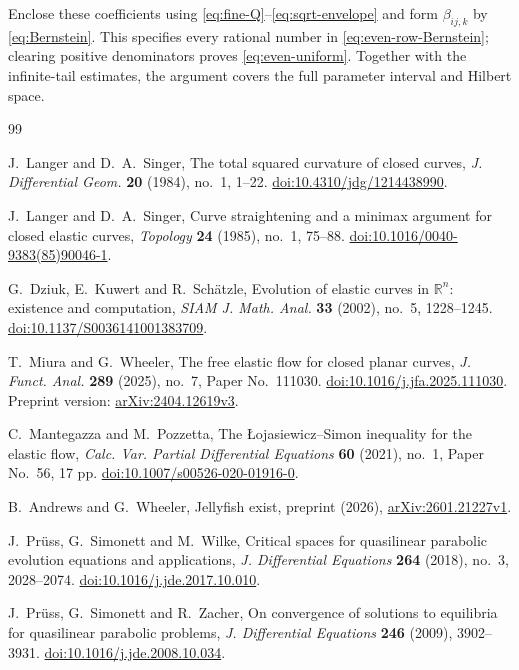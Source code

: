 \documentclass[a4paper,11pt]{article}
\numberwithin{equation}{section}
\theoremstyle{definition}
\theoremstyle{remark}
\newcommand{\R}{\mathbb R}
\begin{document}
Enclose these coefficients using \eqref{eq:fine-Q}--\eqref{eq:sqrt-envelope} and form $\beta_{ij,k}$ by \eqref{eq:Bernstein}. This specifies every rational number in \eqref{eq:even-row-Bernstein}; clearing positive denominators proves \eqref{eq:even-uniform}. Together with the infinite-tail estimates, the argument covers the full parameter interval and Hilbert space.


\begin{thebibliography}{99}
\raggedright
\small
{}
J.~Langer and D.~A.~Singer,
The total squared curvature of closed curves,
\emph{J. Differential Geom.} \textbf{20} (1984), no.~1, 1--22.
\href{https://doi.org/10.4310/jdg/1214438990}{doi:10.4310/jdg/1214438990}.

J.~Langer and D.~A.~Singer,
Curve straightening and a minimax argument for closed elastic curves,
\emph{Topology} \textbf{24} (1985), no.~1, 75--88.
\href{https://doi.org/10.1016/0040-9383(85)90046-1}{doi:10.1016/0040-9383(85)90046-1}.

G.~Dziuk, E.~Kuwert and R.~Sch\"atzle,
Evolution of elastic curves in $\R^n$: existence and computation,
\emph{SIAM J. Math. Anal.} \textbf{33} (2002), no.~5, 1228--1245.
\href{https://doi.org/10.1137/S0036141001383709}{doi:10.1137/S0036141001383709}.

T.~Miura and G.~Wheeler,
The free elastic flow for closed planar curves,
\emph{J. Funct. Anal.} \textbf{289} (2025), no.~7, Paper No.~111030.
\href{https://doi.org/10.1016/j.jfa.2025.111030}{doi:10.1016/j.jfa.2025.111030}.
Preprint version: \href{https://arxiv.org/abs/2404.12619v3}{arXiv:2404.12619v3}.

C.~Mantegazza and M.~Pozzetta,
The \L{}ojasiewicz--Simon inequality for the elastic flow,
\emph{Calc. Var. Partial Differential Equations} \textbf{60} (2021), no.~1, Paper No.~56, 17 pp.
\href{https://doi.org/10.1007/s00526-020-01916-0}{doi:10.1007/s00526-020-01916-0}.

B.~Andrews and G.~Wheeler,
Jellyfish exist,
preprint (2026), \href{https://arxiv.org/abs/2601.21227v1}{arXiv:2601.21227v1}.

J.~Pr\"uss, G.~Simonett and M.~Wilke,
Critical spaces for quasilinear parabolic evolution equations and applications,
\emph{J. Differential Equations} \textbf{264} (2018), no.~3, 2028--2074.
\href{https://doi.org/10.1016/j.jde.2017.10.010}{doi:10.1016/j.jde.2017.10.010}.

J.~Pr\"uss, G.~Simonett and R.~Zacher,
On convergence of solutions to equilibria for quasilinear parabolic problems,
\emph{J. Differential Equations} \textbf{246} (2009), 3902--3931.
\href{https://doi.org/10.1016/j.jde.2008.10.034}{doi:10.1016/j.jde.2008.10.034}.


\end{thebibliography}
\end{document}
